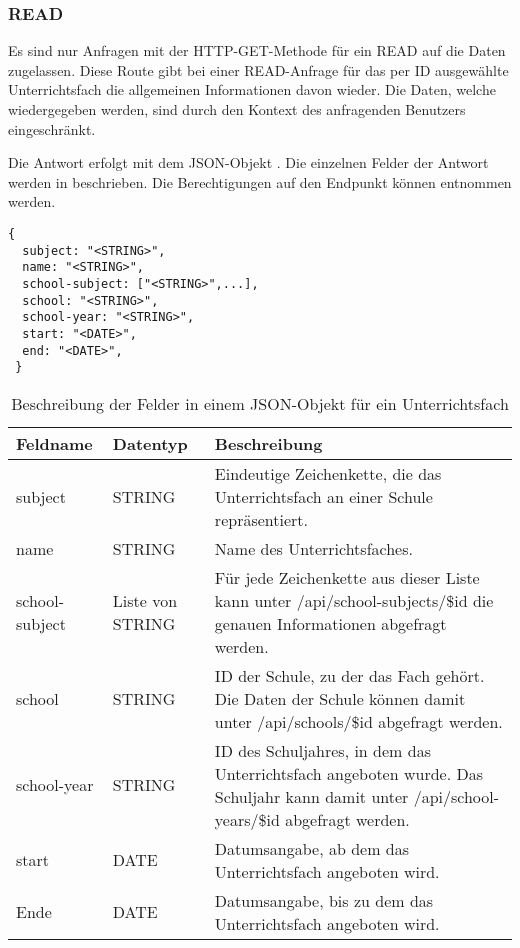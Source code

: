 \subsubsection{READ}
\label{sec:rest:api:subjects:id:read}
Es sind nur Anfragen mit der HTTP-GET-Methode für ein READ auf die Daten zugelassen.
Diese Route gibt bei einer READ-Anfrage für das per ID ausgewählte Unterrichtsfach die allgemeinen Informationen davon wieder.
Die Daten, welche wiedergegeben werden, sind durch den Kontext des anfragenden Benutzers eingeschränkt.

Die Antwort erfolgt mit dem JSON-Objekt . 
Die einzelnen Felder der Antwort werden in  beschrieben.
Die Berechtigungen auf den Endpunkt können  entnommen werden.


\begin{lstlisting}[caption={JSON-Antwort für einen GET-Aufruf des Pfads /api/subjects/\$id},label={lst:code:rest:api:subjects:id:read:ret},frame=tlrb]
 {
  subject: "<STRING>",
  name: "<STRING>",
  school-subject: ["<STRING>",...], 
  school: "<STRING>",
  school-year: "<STRING>",
  start: "<DATE>",
  end: "<DATE>",
 }
\end{lstlisting}

\begin{longtable}{|p{}|p{}|p{}|}
		\caption{Beschreibung der Felder in einem JSON-Objekt für ein Unterrichtsfach}
\endfoot
		\caption{Beschreibung der Felder in einem JSON-Objekt für ein Unterrichtsfach}
		\label{tab:rest:api:subjects:id:read:ret}
\endlastfoot 
\hline
			\textbf{Feldname} & \textbf{Datentyp} & \textbf{Beschreibung} \\ \hline
\endhead
subject & STRING & Eindeutige Zeichenkette, die das Unterrichtsfach an einer Schule repräsentiert.  \\ \hline
name & STRING & Name des Unterrichtsfaches. \\ \hline
school-subject & Liste von STRING & Für jede Zeichenkette aus dieser Liste kann unter /api/school-subjects/\$id die genauen Informationen abgefragt werden. \\ \hline
school & STRING & ID der Schule, zu der das Fach gehört. Die Daten der Schule können damit unter /api/schools/\$id abgefragt werden. \\ \hline
school-year & STRING & ID des Schuljahres, in dem das Unterrichtsfach angeboten wurde. Das Schuljahr kann damit unter /api/school-years/\$id abgefragt werden. \\ \hline
start & DATE & Datumsangabe, ab dem das Unterrichtsfach angeboten wird.  \\ \hline
Ende & DATE & Datumsangabe, bis zu dem das Unterrichtsfach angeboten wird. \\ \hline
\end{longtable}
